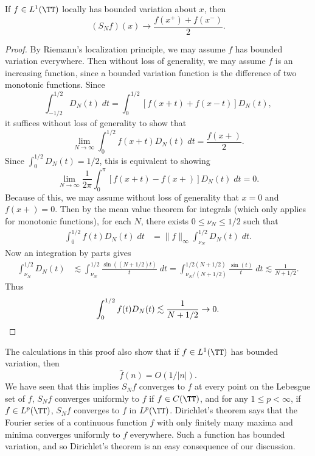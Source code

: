 \begin{lemma}
    If $f \in L^1(\TT)$ locally has bounded variation about $x$, then
    \[ (S_N f)(x) \to \frac{f(x^+) + f(x^-)}{2}. \]
\end{lemma}
\begin{proof}
    By Riemann's localization principle, we may assume $f$ has bounded variation everywhere. Then without loss of generality, we may assume $f$ is an increasing function, since a bounded variation function is the difference of two monotonic functions. Since
    \[ \int_{-1/2}^{1/2} D_N(t)\; dt = \int_0^{1/2} [f(x + t) + f(x - t)] D_N(t), \]
    it suffices without loss of generality to show that
    \[ \lim_{N \to \infty} \int_0^{1/2} f(x+t) D_N(t)\; dt = \frac{f(x+)}{2}. \]
    Since $\int_0^{1/2} D_N(t) = 1/2$, this is equivalent to showing
    \[ \lim_{N \to \infty} \frac{1}{2\pi} \int_0^\pi [f(x + t) - f(x+)] D_N(t)\; dt = 0. \]
    Because of this, we may assume without loss of generality that $x = 0$ and $f(x+) = 0$. Then by the mean value theorem for integrals (which only applies for monotonic functions), for each $N$, there exists $0 \leq \nu_N \leq 1/2$ such that
    \begin{align*}
        \int_0^{1/2} f(t) D_N(t)\; dt &= \| f \|_\infty \int_{\nu_N}^{1/2} D_N(t)\; dt.
    \end{align*}
    Now an integration by parts gives
    \begin{align*}
        \int_{\nu_N}^{1/2} D_N(t) &\lesssim \int_{\nu_N}^{1/2} \frac{\sin((N + 1/2) t)}{t}\; dt = \int_{\nu_N/(N + 1/2)}^{1/2(N + 1/2)} \frac{\sin(t)}{t}\; dt \lesssim \frac{1}{N+1/2}.
    \end{align*}
    Thus
    \[ \int_0^{1/2} f(t) D_N(t) \lesssim \frac{1}{N + 1/2} \to 0. \qedhere \]
\end{proof}

\begin{remark}
    The calculations in this proof also show that if $f \in L^1(\TT)$ has bounded variation, then
    \[ \widehat{f}(n) = O(1/|n|). \]
    We have seen that this implies $S_N f$ converges to $f$ at every point on the Lebesgue set of $f$, $S_N f$ converges uniformly to $f$ if $f \in C(\TT)$, and for any $1 \leq p < \infty$, if $f \in L^p(\TT)$, $S_N f$ converges to $f$ in $L^p(\TT)$. Dirichlet's theorem says that the Fourier series of a continuous function $f$ with only finitely many maxima and minima converges uniformly to $f$ everywhere. Such a function has bounded variation, and so Dirichlet's theorem is an easy consequence of our discussion.
\end{remark}

